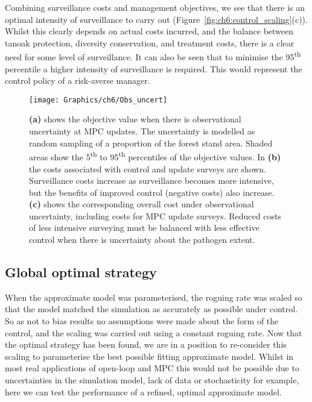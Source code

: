 Combining surveillance costs and management objectives, we see that there is an optimal intensity of surveillance to carry out (Figure~\ref{fig:ch6:control_scaling}(c)). Whilst this clearly depends on actual costs incurred, and the balance between tanoak protection, diversity conservation, and treatment costs, there is a clear need for some level of surveillance. It can also be seen that to minimise the 95\textsuperscript{th} percentile a higher intensity of surveillance is required. This would represent the control policy of a risk-averse manager.

\begin{figure}[t]
    \begin{center}
        \texttt{[image: Graphics/ch6/Obs\_uncert]}
        \caption[Performance of MPC under observational uncertainty]{\textbf{(a)} shows the objective value when there is observational uncertainty at MPC updates. The uncertainty is modelled as random sampling of a proportion of the forest stand area. Shaded areas show the 5\textsuperscript{th} to 95\textsuperscript{th} percentiles of the objective values. In \textbf{(b)} the costs associated with control and update surveys are shown. Surveillance costs increase as surveillance becomes more intensive, but the benefits of improved control (negative costs) also increase. \textbf{(c)} shows the corresponding overall cost under observational uncertainty, including costs for MPC update surveys. Reduced costs of less intensive surveying must be balanced with less effective control when there is uncertainty about the pathogen extent.\label{fig:ch6:obs_uncert}}
    \end{center}
\end{figure}

\FloatBarrier
\subsection{Global optimal strategy}

When the approximate model was parameterised, the roguing rate was scaled so that the model matched the simulation as accurately as possible under control. So as not to bias results no assumptions were made about the form of the control, and the scaling was carried out using a constant roguing rate. Now that the optimal strategy has been found, we are in a position to re-consider this scaling to parameterise the best possible fitting approximate model. Whilst in most real applications of open-loop and MPC this would not be possible due to uncertainties in the simulation model, lack of data or stochasticity for example, here we can test the performance of a refined, optimal approximate model.


